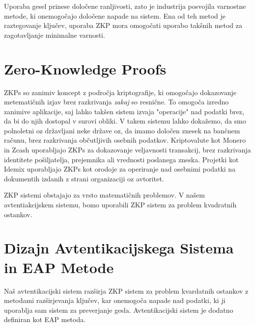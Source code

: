\documentclass[12pt]{article}
\begin{document}
	Uporaba gesel prinese določene ranljivosti, zato je industrija posvojila varnostne metode, ki onemogočajo določene napade na sistem.
	Ena od teh metod je raztegovanje ključev, uporaba ZKP mora omogočati uporabo takšnih metod za zagotavljanje minimalne varnosti.
	
	\section{Zero-Knowledge Proofs}
	ZKPs \cite{goldwasser1989knowledge} so zanimiv koncept z področja kriptografije, ki omogočajo dokazovanje metematičnih izjav brez razkrivanja \textit{zakaj} so resnične.
	To omogoča izredno zanimive aplikacije, saj lahko takšen sistem izvaja "operacije" nad podatki brez, da bi do njih dostopal v surovi obliki.
	V takem sistemu lahko dokažemo, da smo polnoletni oz državljani neke države	oz, da imamo določen znesek na bančnem računu, brez razkrivanja občutljivih osebnih podatkov.
	Kriptovalute kot Monero in Zcash uporabljajo ZKPs za dokazovanje veljavnosti transakcij, brez razkrivanja identitete pošiljatelja, prejemnika ali vrednosti poslanega zneska.
	Projetki kot Idemix \cite{camenisch2002design} uporabljajo ZKPs kot orodoje za operiranje nad osebnimi podatki na dokumentih izdanih z strani organizaciji oz avtoritet.
		
	ZKP sistemi obstajajo za vrsto matematičnih problemov.
	V našem avtentiakcijskem sistemu, bomo uporabili ZKP sistem za problem kvadratnih ostankov.
	
	
	\section{Dizajn Avtentikacijskega Sistema in EAP Metode}
	Naš avtentikacijski sistem razširja ZKP sistem za problem kvardatnih ostankov z metodami razširjevanja ključev, kar onemogoča napade nad podatki, ki ji uporablja sam sistem za preverjanje gesla.
	Avtentikacijski sistem je dodatno definiran kot EAP metoda.
	
	
	
\end{document}
